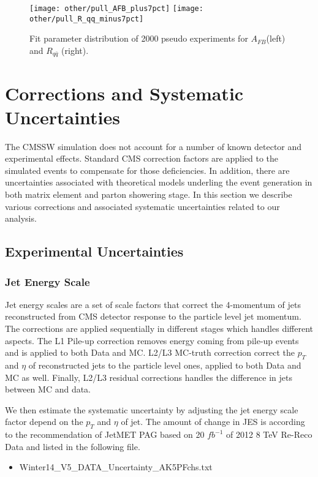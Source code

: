 \begin{figure}[hbt]
	\begin{center}
		\texttt{[image: other/pull\_AFB\_plus7pct]}
		\texttt{[image: other/pull\_R\_qq\_minus7pct]}
		\caption{\small Fit parameter distribution of 2000 pseudo experiments for $A_{FB}$(left) and $R_{q\bar q}$ (right).}
		\label{fig:pseudo-ex}
	\end{center}
\end{figure}

\clearpage

\section{Corrections and Systematic Uncertainties}
\label{sec:corrections}

The CMSSW simulation does not account for a number of known detector and experimental effects.  Standard CMS correction factors are applied to the simulated events to compensate for those deficiencies. In addition, there are uncertainties associated with theoretical models underling the event generation in both matrix element and parton showering stage. In this section we describe various corrections and associated systematic uncertainties related to our analysis.

\subsection{Experimental Uncertainties}

\subsubsection{Jet Energy Scale}
Jet energy scales are a set of scale factors that correct the 4-momentum of jets reconstructed from CMS detector response to the particle level jet momentum. The corrections are applied sequentially in different stages which handles different aspects. The L1 Pile-up correction removes energy coming from pile-up events and is applied to both Data and MC. L2/L3 MC-truth correction correct the $p_T$ and $\eta$ of reconstructed jets to the particle level ones, applied to both Data and MC as well. Finally, L2/L3 residual corrections handles the difference in jets between MC and data.  

We then estimate the systematic uncertainty by adjusting the jet energy scale factor depend on the $p_T$ and $\eta$ of jet. The amount of change in JES is according to the recommendation of JetMET PAG based on 20 $fb^{-1}$ of 2012 8 TeV Re-Reco Data \cite{JES_uncertainty} and listed in the following file.
\begin{itemize}
\item Winter14\_V5\_DATA\_Uncertainty\_AK5PFchs.txt
\end{itemize}

